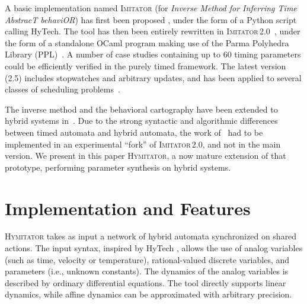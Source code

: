 \documentclass{llncs}
\newcommand{\hytech}{{\sc HyTech}}
\newcommand{\imitator}{\textsc{Imitator}}
\newcommand{\hymitator}{\textsc{Hymitator}}
\newcommand{\ocaml}{OCaml}
\newcommand{\python}{Python}
\newcommand{\commentaire}[1]{}
\begin{document}
A basic implementation named \imitator{} (for \emph{Inverse Method for Inferring Time AbstracT behaviOR}) has first been proposed%
, under the form of a \python{} script calling \hytech{}.
The tool has then been entirely rewritten in \imitator{}\,2.0~\cite{and10}, under the form of a standalone \ocaml{} program making use of the Parma Polyhedra Library (PPL)~\cite{bhz08}.
A number of case studies containing up to 60 timing parameters could be efficiently verified in the purely timed framework.
The latest version (2.5) includes stopwatches and arbitrary updates, and has been applied to several classes of scheduling problems~\cite{afks12}.

The inverse method and the behavioral cartography have been extended to hybrid systems in~\cite{FK11}.
Due to the strong syntactic and algorithmic differences between timed automata and hybrid automata, the work of~\cite{FK11} had to be implemented in an experimental ``fork'' of \imitator{}\,2.0, and not in the main version.
We present in this paper \hymitator{}, a now mature extension of that prototype, performing parameter synthesis on hybrid systems.





% 
% 
% 
% 
% 

\section{Implementation and Features}

\hymitator{} takes as input a network of hybrid automata synchronized on shared actions.
The input syntax, inspired by \hytech{}%
, allows the use of analog variables (such as time, velocity or temperature), rational-valued discrete variables, and parameters (i.e., unknown constants). The dynamics of the analog variables is described by ordinary differential equations. The tool directly supports linear dynamics, while affine dynamics can be approximated with arbitrary precision.
\end{document}
